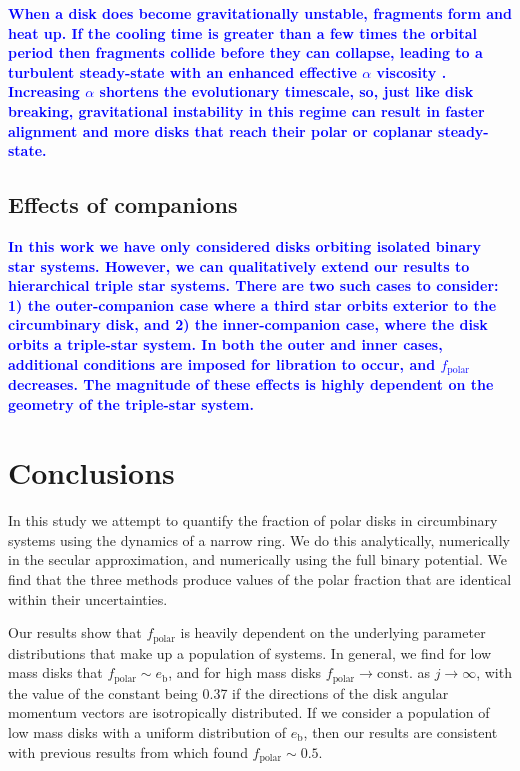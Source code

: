 \documentclass[twocolumn,linenumbers]{aastex631}
\newcommand{\RR}[1]{\textcolor{blue}{\bf#1}} %
\begin{document}
\RR{
    When a disk does become gravitationally unstable, fragments form and heat up. If the cooling time is greater than a few times the orbital period then fragments collide before they can collapse, leading to a turbulent steady-state with an enhanced effective $\alpha$ viscosity \citep{gammie2001}. Increasing $\alpha$ shortens the evolutionary timescale, so, just like disk breaking, gravitational instability in this regime can result in faster alignment and more disks that reach their polar or coplanar steady-state.
}

\subsection{Effects of companions}
\RR{
    In this work we have only considered disks orbiting isolated binary star systems. However, we can qualitatively extend our results to hierarchical triple star systems. There are two such cases to consider: 1) the outer-companion case where a third star orbits exterior to the circumbinary disk, and 2) the inner-companion case, where the disk orbits a triple-star system. In both the outer \citep[see][]{martin2022,ceppi2023} and inner \citep[see][]{lepp2023,lepp2025} cases, additional conditions are imposed for libration to occur, and $f_\text{polar}$ decreases. The magnitude of these effects is highly dependent on the geometry of the triple-star system.
}

\section{Conclusions}
\label{sec:conclusions}

In this study we attempt to quantify the fraction of polar disks in circumbinary systems using the dynamics of a narrow ring. We do this analytically, numerically in the secular approximation, and numerically using the full binary potential. We find that the three methods produce values of the polar fraction that are identical within their uncertainties.

Our results show that $f_\text{polar}$ is heavily dependent on the underlying parameter distributions that make up a population of systems. In general, we find for low mass disks that $f_\text{polar} \sim e_\text{b}$, and for high mass disks $f_\text{polar} \rightarrow \text{const.}$ as $j\rightarrow \infty$, with the value of the constant being 0.37 if the directions of the disk angular momentum vectors are isotropically distributed.
If we consider a population of low mass disks with a uniform distribution of $e_\text{b}$, then our results are consistent with previous results from \citet{ceppi2024} which found $f_\text{polar}\sim 0.5$. 
\end{document}
